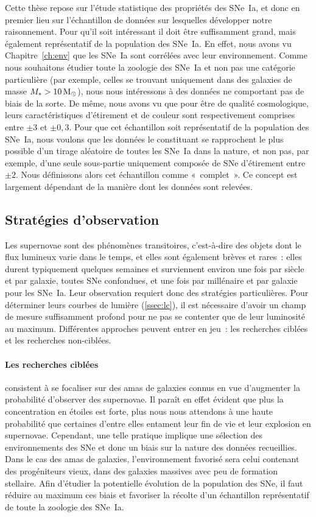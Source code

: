 \documentclass[../main/main.tex]{subfiles}
\begin{document}
Cette thèse repose sur l'étude statistique des propriétés des SNe~Ia, et donc en
premier lieu sur l'échantillon de données sur lesquelles développer notre
raisonnement. Pour qu'il soit intéressant il doit être suffisamment grand, mais
également représentatif de la population des SNe~Ia. En effet, nous avons vu
Chapitre~\ref{ch:env} que les SNe~Ia sont corrélées avec leur environnement.
Comme nous souhaitons étudier toute la zoologie des SNe~Ia et non pas une
catégorie particulière (par exemple, celles se trouvant uniquement dans des
galaxies de masse $M_* > \SI{10}{M\ensuremath{_{\odot}}}$), nous nous intéressons à des données
ne comportant pas de biais de la sorte. De même, nous avons vu que pour être de
qualité cosmologique, leurs caractéristiques d'étirement et de couleur sont
respectivement comprises entre $\pm3$ et $\pm0,3$. Pour que cet échantillon soit
représentatif de la population des SNe~Ia, nous voulons que les données le
constituant se rapprochent le plus possible d'un tirage aléatoire de toutes les
SNe~Ia dans la nature, et non pas, par exemple, d'une seule sous-partie
uniquement composée de SNe d'étirement entre $\pm2$. Nous définissons alors cet
échantillon comme «~complet~». Ce concept est largement dépendant de la manière
dont les données sont relevées.

\subsection{Stratégies d'observation}\label{ssec:stratobs}

Les supernovae sont des phénomènes transitoires, c'est-à-dire des objets dont le
flux lumineux varie dans le temps, et elles sont également brèves et rares~:
elles durent typiquement quelques semaines et surviennent environ une fois par
siècle et par galaxie, toutes SNe confondues, et une fois par millénaire et par
galaxie pour les SNe~Ia. Leur observation requiert donc des stratégies
particulières. Pour déterminer leurs courbes de lumière (\ref{ssec:lc}), il est
nécessaire d'avoir un champ de mesure suffisamment profond pour ne pas se
contenter que de leur luminosité au maximum. Différentes approches peuvent
entrer en jeu~: les recherches ciblées et les recherches non-ciblées.

\paragraph*{Les recherches ciblées} consistent à se focaliser sur des amas de
galaxies connus en vue d'augmenter la probabilité d'observer des supernovae. Il
paraît en effet évident que plus la concentration en étoiles est forte, plus
nous nous attendons à une haute probabilité que certaines d'entre elles
entament leur fin de vie et leur explosion en supernovae. Cependant, une telle
pratique implique une sélection des environnements des SNe et donc un biais sur
la nature des données recueillies. Dans le cas des amas de galaxies,
l'environnement favorisé sera celui contenant des progéniteurs vieux, dans des
galaxies massives avec peu de formation stellaire. Afin d'étudier la potentielle
évolution de la population des SNe, il faut réduire au maximum ces biais et
favoriser la récolte d'un échantillon représentatif de toute la zoologie des
SNe~Ia.
\end{document}
